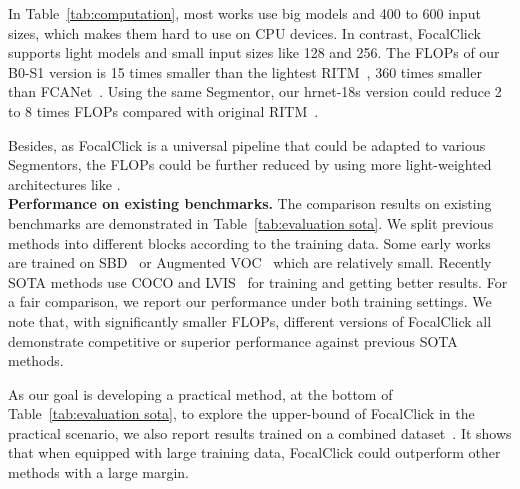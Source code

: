 \documentclass[10pt,twocolumn,letterpaper]{article}
\begin{document}
In Table~\ref{tab:computation}, most works use big models and 400 to 600 input sizes, which makes them hard to use on CPU devices. In contrast, FocalClick supports light models and small input sizes like 128 and 256. The FLOPs of our B0-S1 version is 15 times smaller than the lightest RITM~\cite{sofiiuk2021ritm}, 360 times smaller than  FCANet~\cite{firstclick}. Using the same Segmentor, our hrnet-18s version could reduce 2 to 8 times FLOPs compared with original RITM~\cite{sofiiuk2021ritm}. 

Besides, as FocalClick is a universal pipeline that could be adapted to various Segmentors, the FLOPs could be further reduced by using more light-weighted architectures like \cite{howard2017mobilenets,tan2019efficientnet}.\\



\noindent \textbf{Performance on existing benchmarks. }The comparison results on existing benchmarks are demonstrated in Table~\ref{tab:evaluation sota}.
We split previous methods into different blocks according to the training data. Some early works are trained on SBD~\cite{SBD} or Augmented VOC~\cite{SBD,everingham2010pascal} which are relatively small. Recently SOTA methods use COCO\cite{lin2014coco} and LVIS~\cite{gupta2019lvis} for training and getting better results. For a fair comparison, we report our performance under both training settings.
We note that, with significantly smaller FLOPs, different versions of FocalClick all demonstrate competitive or superior performance against previous SOTA methods.

As our goal is developing a practical method, at the bottom of Table~\ref{tab:evaluation sota}, to explore the upper-bound of FocalClick in the practical scenario, we also report results trained on a combined dataset~\cite{lin2014coco,gupta2019lvis,borji2015msra10k,ade20k,wang2017learningduts,xu2018youtubevos,thinobject,cong2020dovenet}. It shows that when equipped with large training data, FocalClick could outperform other methods with a large margin.
\end{document}
